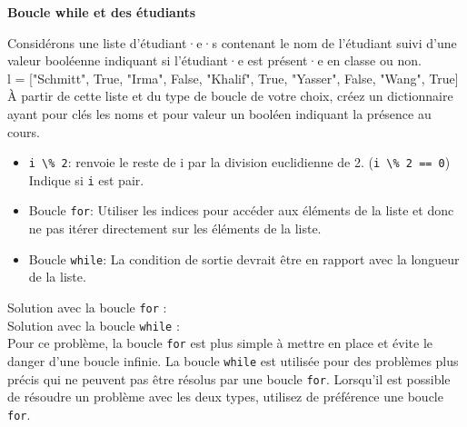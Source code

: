     
    \begin{Exercice}[10 minutes] \textbf{Boucle while et des étudiants}
      	
      	Considérons une liste d'étudiant·e·s contenant le nom de l'étudiant suivi d'une valeur booléenne indiquant si l'étudiant·e est présent·e en classe ou non. \\
      	
      	l = ["Schmitt", True, "Irma", False, "Khalif", True, "Yasser", False, "Wang", True] \\
      	
      	À partir de cette liste et du type de boucle de votre choix, créez un dictionnaire ayant pour clés les noms et pour valeur un booléen indiquant la présence au cours.
    
        \begin{conseil}
           \begin{itemize}
           		\item \lstinline{i \% 2}: renvoie le reste de i par la division euclidienne de 2. (\lstinline{i \% 2 == 0}) Indique si \lstinline{i} est pair.
           	\item Boucle \lstinline{for}: Utiliser les indices pour accéder aux éléments de la liste et donc ne pas itérer directement sur les éléments de la liste.
           	\item Boucle \lstinline{while}: La condition de sortie devrait être en rapport avec la longueur de la liste.
           \end{itemize}
		     
        \end{conseil}
        
        \begin{solution}
        	Solution avec la boucle \lstinline{for} : \\
        
            
            
            Solution avec la boucle \lstinline{while} : \\
            
            
            
            
            Pour ce problème, la boucle \lstinline{for} est plus simple à mettre en place et évite le danger d'une boucle infinie. La boucle \lstinline{while} est utilisée pour des problèmes plus précis qui ne peuvent pas être résolus par une boucle \lstinline{for}. Lorsqu'il est possible de résoudre un problème avec les deux types, utilisez de préférence une boucle \lstinline{for}.
            
          
        \end{solution}
    \end{Exercice}
    
